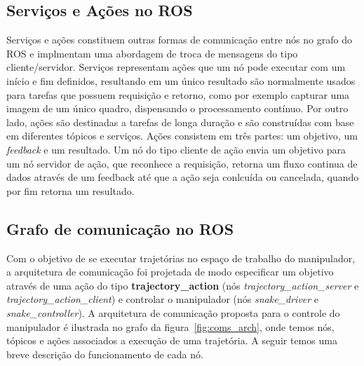 \subsection*{Serviços e Ações no ROS}

Serviços e ações constituem outras formas de comunicação entre nós no grafo do
ROS e implmentam uma abordagem de troca de mensagens do tipo cliente/servidor.
Serviços representam ações que um nó pode executar com um início e fim
definidos, resultando em um único resultado são normalmente usados para tarefas
que possuem requisição e retorno, como por exemplo capturar uma imagem de um
único quadro, dispensando o processamento contínuo. Por outro lado, ações são
destinadas a tarefas de longa duração e são construídas com base em diferentes
tópicos e serviços. Ações consistem em três partes: um objetivo, um
\emph{feedback} e um resultado. Um nó do tipo cliente de ação envia um objetivo
para um nó servidor de ação, que reconhece a requisição, retorna um fluxo
continua de dados através de um feedback até que a ação seja conlcuída ou
cancelada, quando por fim retorna um resultado.

\subsection*{Grafo de comunicação no ROS}

Com o objetivo de se executar trajetórias no espaço de trabalho do manipulador,
a arquitetura de comunicação foi projetada de modo especificar um objetivo
através de uma ação do tipo \textbf{trajectory\_action} (nós
\emph{trajectory\_action\_server} e \emph{trajectory\_action\_client}) e
controlar o manipulador (nós \emph{snake\_driver} e \emph{snake\_controller}).
A arquitetura de comunicação proposta para o controle do manipulador é
ilustrada no grafo da figura~\ref{fig:coms_arch}, onde temos nós, tópicos e
ações associados a execução de uma trajetória. A seguir temos uma breve
descrição do funcionamento de cada nó.

